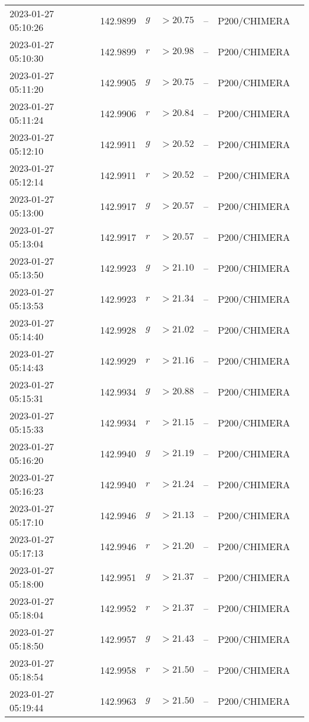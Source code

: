 \documentclass{nature_plusfigure}
\begin{document}
\begin{supplement}
\begin{center}
\begin{longtable}{lllllll}
2023-01-27 05:10:26 & 142.9899 & $g$ & $>20.75$ & -- & P200/CHIMERA &  \\ 
2023-01-27 05:10:30 & 142.9899 & $r$ & $>20.98$ & -- & P200/CHIMERA &  \\ 
2023-01-27 05:11:20 & 142.9905 & $g$ & $>20.75$ & -- & P200/CHIMERA &  \\ 
2023-01-27 05:11:24 & 142.9906 & $r$ & $>20.84$ & -- & P200/CHIMERA &  \\ 
2023-01-27 05:12:10 & 142.9911 & $g$ & $>20.52$ & -- & P200/CHIMERA &  \\ 
2023-01-27 05:12:14 & 142.9911 & $r$ & $>20.52$ & -- & P200/CHIMERA &  \\ 
2023-01-27 05:13:00 & 142.9917 & $g$ & $>20.57$ & -- & P200/CHIMERA &  \\ 
2023-01-27 05:13:04 & 142.9917 & $r$ & $>20.57$ & -- & P200/CHIMERA &  \\ 
2023-01-27 05:13:50 & 142.9923 & $g$ & $>21.10$ & -- & P200/CHIMERA &  \\ 
2023-01-27 05:13:53 & 142.9923 & $r$ & $>21.34$ & -- & P200/CHIMERA &  \\ 
2023-01-27 05:14:40 & 142.9928 & $g$ & $>21.02$ & -- & P200/CHIMERA &  \\ 
2023-01-27 05:14:43 & 142.9929 & $r$ & $>21.16$ & -- & P200/CHIMERA &  \\ 
2023-01-27 05:15:31 & 142.9934 & $g$ & $>20.88$ & -- & P200/CHIMERA &  \\ 
2023-01-27 05:15:33 & 142.9934 & $r$ & $>21.15$ & -- & P200/CHIMERA &  \\ 
2023-01-27 05:16:20 & 142.9940 & $g$ & $>21.19$ & -- & P200/CHIMERA &  \\ 
2023-01-27 05:16:23 & 142.9940 & $r$ & $>21.24$ & -- & P200/CHIMERA &  \\ 
2023-01-27 05:17:10 & 142.9946 & $g$ & $>21.13$ & -- & P200/CHIMERA &  \\ 
2023-01-27 05:17:13 & 142.9946 & $r$ & $>21.20$ & -- & P200/CHIMERA &  \\ 
2023-01-27 05:18:00 & 142.9951 & $g$ & $>21.37$ & -- & P200/CHIMERA &  \\ 
2023-01-27 05:18:04 & 142.9952 & $r$ & $>21.37$ & -- & P200/CHIMERA &  \\ 
2023-01-27 05:18:50 & 142.9957 & $g$ & $>21.43$ & -- & P200/CHIMERA &  \\ 
2023-01-27 05:18:54 & 142.9958 & $r$ & $>21.50$ & -- & P200/CHIMERA &  \\ 
2023-01-27 05:19:44 & 142.9963 & $g$ & $>21.50$ & -- & P200/CHIMERA &  \\ 

\end{longtable}
\end{center}
\end{supplement}
\end{document}
